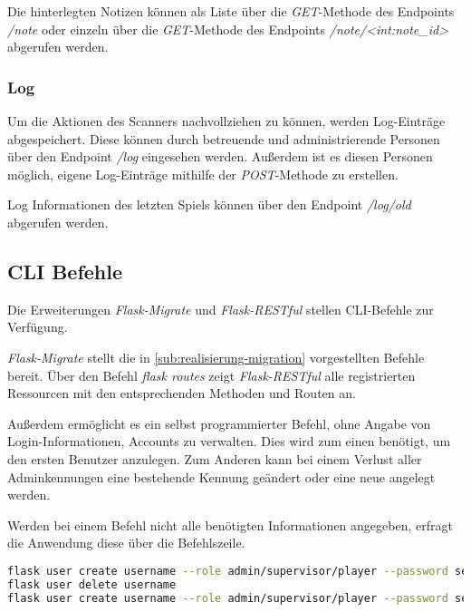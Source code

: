 Die hinterlegten Notizen können als Liste über die \textit{GET}-Methode des Endpoints \textit{/note} oder einzeln über die \textit{GET}-Methode des Endpoints \textit{/note/<int:note\_id>} abgerufen werden.

\subsubsection{Log}
Um die Aktionen des Scanners nachvollziehen zu können, werden Log-Einträge abgespeichert. Diese können durch betreuende und administrierende Personen über den Endpoint \textit{/log} eingesehen werden. Außerdem ist es diesen Personen möglich, eigene Log-Einträge mithilfe der \textit{POST}-Methode zu erstellen.

Log Informationen des letzten Spiels können über den Endpoint \textit{/log/old} abgerufen werden.
	
\subsection{CLI Befehle}
Die Erweiterungen \textit{Flask-Migrate} und \textit{Flask-RESTful} stellen CLI-Befehle zur Verfügung. 

\textit{Flask-Migrate} stellt die in \autoref{sub:realisierung-migration} vorgestellten Befehle bereit. Über den Befehl \textit{flask routes} zeigt \textit{Flask-RESTful} alle registrierten Ressourcen mit den entsprechenden Methoden und Routen an.

Außerdem ermöglicht es ein selbst programmierter Befehl, ohne Angabe von \linebreak
Login-Informationen, Accounts zu verwalten. Dies wird zum einen benötigt, um den ersten Benutzer anzulegen. Zum Anderen kann bei einem Verlust aller Adminkennungen eine bestehende Kennung geändert oder eine neue angelegt werden. 

Werden bei einem Befehl nicht alle benötigten Informationen angegeben, erfragt die Anwendung diese über die Befehlszeile.

\begin{lstlisting}[language=bash, frame=single, caption={GIS CLI}, captionpos=b, label={lst:gis-cli}]
flask user create username --role admin/supervisor/player --password secure_pw
flask user delete username
flask user create username --role admin/supervisor/player --password secure_pw
\end{lstlisting}
